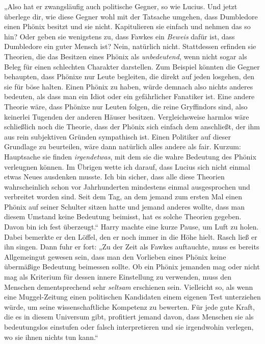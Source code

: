 „Also hat er zwangsläufig auch politische Gegner, so wie Lucius. Und jetzt überlege dir, wie diese Gegner wohl mit der Tatsache umgehen, dass Dumbledore einen Phönix besitzt und sie nicht. Kapitulieren sie einfach und nehmen das so hin? Oder geben sie wenigstens zu, dass Fawkes ein \emph{Beweis} dafür ist, dass Dumbledore ein guter Mensch ist? Nein, natürlich nicht. Stattdessen erfinden sie Theorien, die das Besitzen eines Phönix als \emph{unbedeutend}, wenn nicht sogar als Beleg für einen schlechten Charakter darstellen. Zum Beispiel könnten die Gegner behaupten, dass Phönixe nur Leute begleiten, die direkt auf jeden losgehen, den sie für böse halten. Einen Phönix zu haben, würde demnach also nichts anderes bedeuten, als dass man ein Idiot oder ein gefährlicher Fanatiker ist. Eine andere Theorie wäre, dass Phönixe nur Leuten folgen, die reine Gryffindors sind, also keinerlei Tugenden der anderen Häuser besitzen. Vergleichsweise harmlos wäre schließlich noch die Theorie, dass der Phönix sich einfach dem anschließt, der ihm aus rein subjektiven Gründen sympathisch ist. Einen Politiker auf dieser Grundlage zu beurteilen, wäre dann natürlich alles andere als fair. Kurzum: Hauptsache sie finden \emph{irgendetwas}, mit dem sie die wahre Bedeutung des Phönix verleugnen können. Im Übrigen wette ich darauf, dass Lucius sich nicht einmal etwas Neues ausdenken musste. Ich bin sicher, dass alle diese Theorien wahrscheinlich schon vor Jahrhunderten mindestens einmal ausgesprochen und verbreitet worden sind. Seit dem Tag, an dem jemand zum ersten Mal einen Phönix auf seiner Schulter sitzen hatte und jemand anderes wollte, dass man diesem Umstand keine Bedeutung beimisst, hat es solche Theorien gegeben. Davon bin ich fest überzeugt.“
%
Harry machte eine kurze Pause, um Luft zu holen. Dabei bemerkte er den Löffel, den er noch immer in die Höhe hielt. Rasch ließ er ihn singen. Dann fuhr er fort:
„Zu der Zeit als Fawkes auftauchte, muss es bereits Allgemeingut gewesen sein, dass man den Vorlieben eines Phönix keine übermäßige Bedeutung beimessen sollte. Ob ein Phönix jemanden mag oder nicht mag als Kriterium für dessen innere Einstellung zu verwenden, muss den Menschen dementsprechend sehr \emph{seltsam} erschienen sein. Vielleicht so, als wenn eine Muggel-Zeitung einen politischen Kandidaten einem eigenen Test unterziehen würde, um seine wissenschaftliche Kompetenz zu bewerten. Für jede gute Kraft, die es in diesem Universum gibt, profitiert jemand davon, dass Menschen sie als bedeutungslos einstufen oder falsch interpretieren und sie irgendwohin verlegen, wo sie ihnen nichts tun kann.“

